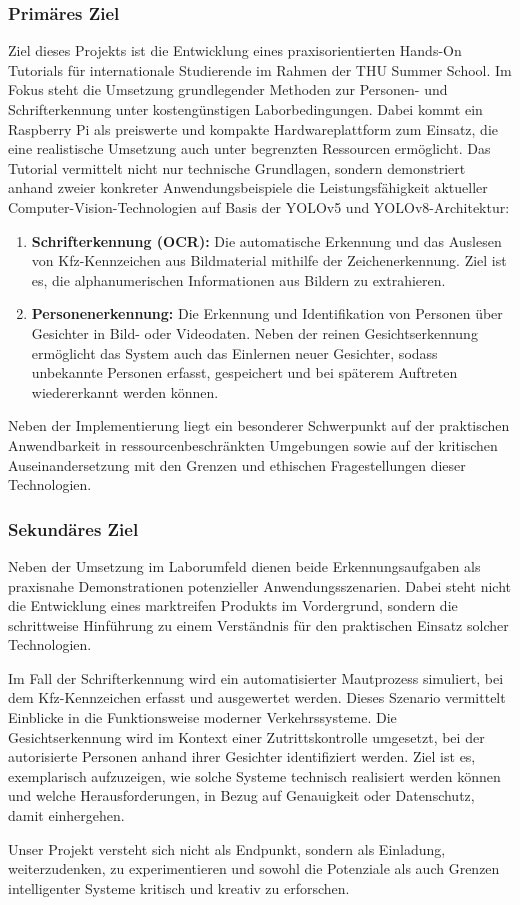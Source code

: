 \subsubsection{Primäres Ziel}Ziel dieses Projekts ist die Entwicklung eines praxisorientierten Hands-On Tutorials für internationale Studierende im Rahmen der THU Summer School. Im Fokus steht die Umsetzung grundlegender Methoden zur Personen- und Schrifterkennung unter kostengünstigen Laborbedingungen. Dabei kommt ein Raspberry Pi als preiswerte und kompakte Hardwareplattform zum Einsatz, die eine realistische Umsetzung auch unter begrenzten Ressourcen ermöglicht. 
Das Tutorial vermittelt nicht nur technische Grundlagen, sondern demonstriert anhand zweier konkreter Anwendungsbeispiele die Leistungsfähigkeit aktueller Computer-Vision-Technologien auf Basis der YOLOv5 und YOLOv8-Architektur:
\begin{enumerate}
    \item\textbf{Schrifterkennung (OCR):} Die automatische Erkennung und das Auslesen von Kfz-Kennzeichen aus Bildmaterial mithilfe der Zeichenerkennung. Ziel ist es, die alphanumerischen Informationen aus Bildern zu extrahieren.
    \item\textbf{Personenerkennung:} Die Erkennung und Identifikation von Personen über Gesichter in Bild- oder Videodaten. Neben der reinen Gesichtserkennung ermöglicht das System auch das Einlernen neuer Gesichter, sodass unbekannte Personen erfasst, gespeichert und bei späterem Auftreten wiedererkannt werden können.
\end{enumerate}
    Neben der Implementierung liegt ein besonderer Schwerpunkt auf der praktischen Anwendbarkeit in ressourcenbeschränkten Umgebungen sowie auf der kritischen Auseinandersetzung mit den Grenzen und ethischen Fragestellungen dieser Technologien. 
\subsubsection{Sekundäres Ziel}Neben der Umsetzung im Laborumfeld dienen beide Erkennungsaufgaben als praxisnahe Demonstrationen potenzieller Anwendungsszenarien. Dabei steht nicht die Entwicklung eines marktreifen Produkts im Vordergrund, sondern die schrittweise Hinführung zu einem Verständnis für den praktischen Einsatz solcher Technologien. 

Im Fall der Schrifterkennung wird ein automatisierter Mautprozess simuliert, bei dem Kfz-Kennzeichen erfasst und ausgewertet werden. Dieses Szenario vermittelt Einblicke in die Funktionsweise moderner Verkehrssysteme. 
Die Gesichtserkennung wird im Kontext einer Zutrittskontrolle umgesetzt, bei der autorisierte Personen anhand ihrer Gesichter identifiziert werden. Ziel ist es, exemplarisch aufzuzeigen, wie solche Systeme technisch realisiert werden können und welche Herausforderungen, in Bezug auf Genauigkeit oder Datenschutz, damit einhergehen. 

Unser Projekt versteht sich nicht als Endpunkt, sondern als Einladung, weiterzudenken, zu experimentieren und sowohl die Potenziale als auch Grenzen intelligenter Systeme kritisch und kreativ zu erforschen. 